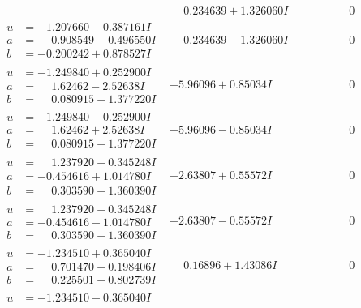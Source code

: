 \documentclass[1p]{elsarticle_modified}
\theoremstyle{definition}
\begin{document}
$$\begin{array}{c|c|c}
 & \phantom{-}0.234639 + 1.326060 I & \phantom{-0.000000 } 0 \\ \hline\begin{aligned}
u &= -1.207660 - 0.387161 I \\
a &= \phantom{-}0.908549 + 0.496550 I \\
b &= -0.200242 + 0.878527 I\end{aligned}
 & \phantom{-}0.234639 - 1.326060 I & \phantom{-0.000000 } 0 \\ \hline\begin{aligned}
u &= -1.249840 + 0.252900 I \\
a &= \phantom{-}1.62462 - 2.52638 I \\
b &= \phantom{-}0.080915 - 1.377220 I\end{aligned}
 & -5.96096 + 0.85034 I & \phantom{-0.000000 } 0 \\ \hline\begin{aligned}
u &= -1.249840 - 0.252900 I \\
a &= \phantom{-}1.62462 + 2.52638 I \\
b &= \phantom{-}0.080915 + 1.377220 I\end{aligned}
 & -5.96096 - 0.85034 I & \phantom{-0.000000 } 0 \\ \hline\begin{aligned}
u &= \phantom{-}1.237920 + 0.345248 I \\
a &= -0.454616 + 1.014780 I \\
b &= \phantom{-}0.303590 + 1.360390 I\end{aligned}
 & -2.63807 + 0.55572 I & \phantom{-0.000000 } 0 \\ \hline\begin{aligned}
u &= \phantom{-}1.237920 - 0.345248 I \\
a &= -0.454616 - 1.014780 I \\
b &= \phantom{-}0.303590 - 1.360390 I\end{aligned}
 & -2.63807 - 0.55572 I & \phantom{-0.000000 } 0 \\ \hline\begin{aligned}
u &= -1.234510 + 0.365040 I \\
a &= \phantom{-}0.701470 - 0.198406 I \\
b &= \phantom{-}0.225501 - 0.802739 I\end{aligned}
 & \phantom{-}0.16896 + 1.43086 I & \phantom{-0.000000 } 0 \\ \hline\begin{aligned}
u &= -1.234510 - 0.365040 I \\

\end{aligned}
\end{array}$$
\end{document}
